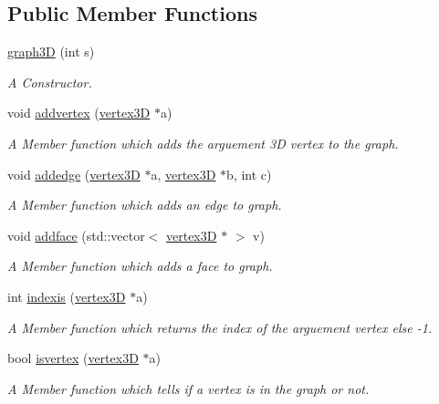 \subsection*{Public Member Functions}
\begin{DoxyCompactItemize}
\item 
\hyperlink{classgraph3D_afc08df517e186ff3e3b9e7a7e1f34f44}{graph3D} (int s)
\begin{DoxyCompactList}\small\item\em A Constructor. \end{DoxyCompactList}\item 
void \hyperlink{classgraph3D_afc9caffb42c40e6f952b07295094ad57}{addvertex} (\hyperlink{classvertex3D}{vertex3D} $\ast$a)
\begin{DoxyCompactList}\small\item\em A Member function which adds the arguement 3D vertex to the graph. \end{DoxyCompactList}\item 
void \hyperlink{classgraph3D_a4f2a5e18655c4667438af55a136f381e}{addedge} (\hyperlink{classvertex3D}{vertex3D} $\ast$a, \hyperlink{classvertex3D}{vertex3D} $\ast$b, int c)
\begin{DoxyCompactList}\small\item\em A Member function which adds an edge to graph. \end{DoxyCompactList}\item 
void \hyperlink{classgraph3D_ac2d0f130cd68efe98855a21c9d253159}{addface} (std\+::vector$<$ \hyperlink{classvertex3D}{vertex3D} $\ast$ $>$ v)
\begin{DoxyCompactList}\small\item\em A Member function which adds a face to graph. \end{DoxyCompactList}\item 
int \hyperlink{classgraph3D_ae71fa4ac2b1ea51db4899ee0a57dd59c}{indexis} (\hyperlink{classvertex3D}{vertex3D} $\ast$a)
\begin{DoxyCompactList}\small\item\em A Member function which returns the index of the arguement vertex else -\/1. \end{DoxyCompactList}\item 
bool \hyperlink{classgraph3D_a9d9e7f67e635b5aa896275072b39fbdd}{isvertex} (\hyperlink{classvertex3D}{vertex3D} $\ast$a)
\begin{DoxyCompactList}\small\item\em A Member function which tells if a vertex is in the graph or not. \end{DoxyCompactList}\item 

\end{DoxyCompactItemize}
